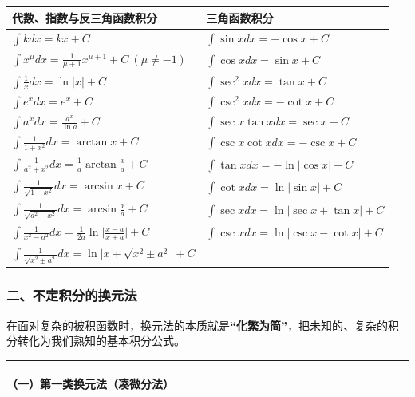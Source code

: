 \documentclass[
]{article}
\newcounter{none} %
\begin{document}
{\def\LTcaptype{none} %
\begin{longtable}[]{@{}ll@{}}
\toprule\noalign{}
\textbf{代数、指数与反三角函数积分} & \textbf{三角函数积分} \\
\midrule\noalign{}
\endhead
\bottomrule\noalign{}
\endlastfoot
\(\int k dx = kx + C\) & \(\int \sin x dx = -\cos x + C\) \\
\(\int x^\mu dx = \frac{1}{\mu+1}x^{\mu+1} + C \ (\mu \neq -1)\) &
\(\int \cos x dx = \sin x + C\) \\
\(\int \frac{1}{x} dx = \ln \lvert x \rvert + C\) &
\(\int \sec^2 x dx = \tan x + C\) \\
\(\int e^x dx = e^x + C\) & \(\int \csc^2 x dx = -\cot x + C\) \\
\(\int a^x dx = \frac{a^x}{\ln a} + C\) &
\(\int \sec x \tan x dx = \sec x + C\) \\
\(\int \frac{1}{1+x^2} dx = \arctan x + C\) &
\(\int \csc x \cot x dx = -\csc x + C\) \\
\(\int \frac{1}{a^2+x^2} dx = \frac{1}{a} \arctan \frac{x}{a} + C\) &
\(\int \tan x dx = -\ln \lvert \cos x \rvert + C\) \\
\(\int \frac{1}{\sqrt{1-x^2}} dx = \arcsin x + C\) &
\(\int \cot x dx = \ln \lvert \sin x \rvert + C\) \\
\(\int \frac{1}{\sqrt{a^2-x^2}} dx = \arcsin \frac{x}{a} + C\) &
\(\int \sec x dx = \ln \lvert \sec x + \tan x \rvert + C\) \\
\(\int \frac{1}{x^2-a^2} dx = \frac{1}{2a} \ln \lvert \frac{x-a}{x+a} \rvert + C\)
& \(\int \csc x dx = \ln \lvert \csc x - \cot x \rvert + C\) \\
\(\int \frac{1}{\sqrt{x^2 \pm a^2}} dx = \ln \lvert x + \sqrt{x^2 \pm a^2} \rvert + C\)
& \\
\end{longtable}
}

\subsubsection{二、不定积分的换元法}\label{ux4e8cux4e0dux5b9aux79efux5206ux7684ux6362ux5143ux6cd5}

在面对复杂的被积函数时，换元法的本质就是\textbf{``化繁为简''}，把未知的、复杂的积分转化为我们熟知的基本积分公式。

\begin{center}\rule{0.5\linewidth}{0.5pt}\end{center}

\paragraph{（一）第一类换元法（凑微分法）}\label{ux4e00uxff09ux7b2cux4e00ux7c7bux6362ux5143ux6cd5ux51d1ux5faeux5206ux6cd5uxff09}
\end{document}

